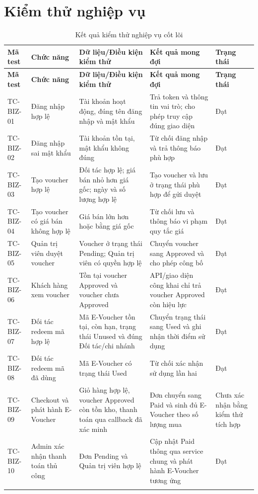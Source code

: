 \section{Kiểm thử nghiệp vụ}

\footnotesize
\begin{longtable}{|p{1.4cm}|p{2.6cm}|p{3.6cm}|p{3.7cm}|p{1.5cm}|}
\hline
\textbf{Mã test} & \textbf{Chức năng} & \textbf{Dữ liệu/Điều kiện kiểm thử} & \textbf{Kết quả mong đợi} & \textbf{Trạng thái} \\ \hline
\endfirsthead
\hline
\textbf{Mã test} & \textbf{Chức năng} & \textbf{Dữ liệu/Điều kiện kiểm thử} & \textbf{Kết quả mong đợi} & \textbf{Trạng thái} \\ \hline
\endhead
TC-BIZ-01 & Đăng nhập hợp lệ & Tài khoản hoạt động, đúng tên đăng nhập và mật khẩu & Trả token và thông tin vai trò; cho phép truy cập đúng giao diện & Đạt \\ \hline
TC-BIZ-02 & Đăng nhập sai mật khẩu & Tài khoản tồn tại, mật khẩu không đúng & Từ chối đăng nhập và trả thông báo phù hợp & Đạt \\ \hline
TC-BIZ-03 & Tạo voucher hợp lệ & Đối tác hợp lệ; giá bán nhỏ hơn giá gốc; ngày và số lượng hợp lệ & Tạo voucher và lưu ở trạng thái phù hợp để gửi duyệt & Đạt \\ \hline
TC-BIZ-04 & Tạo voucher có giá bán không hợp lệ & Giá bán lớn hơn hoặc bằng giá gốc & Từ chối lưu và thông báo vi phạm quy tắc giá & Đạt \\ \hline
TC-BIZ-05 & Quản trị viên duyệt voucher & Voucher ở trạng thái Pending; Quản trị viên có quyền hợp lệ & Chuyển voucher sang Approved và cho phép công bố & Đạt \\ \hline
TC-BIZ-06 & Khách hàng xem voucher & Tồn tại voucher Approved và voucher chưa Approved & API/giao diện công khai chỉ trả voucher Approved còn hiệu lực & Đạt \\ \hline
TC-BIZ-07 & Đối tác redeem mã hợp lệ & Mã E-Voucher tồn tại, còn hạn, trạng thái Unused và đúng Đối tác/chi nhánh & Chuyển trạng thái sang Used và ghi nhận thời điểm sử dụng & Đạt \\ \hline
TC-BIZ-08 & Đối tác redeem mã đã dùng & Mã E-Voucher có trạng thái Used & Từ chối xác nhận sử dụng lần hai & Đạt \\ \hline
TC-BIZ-09 & Checkout và phát hành E-Voucher & Giỏ hàng hợp lệ, voucher Approved còn tồn kho, thanh toán qua callback đã xác minh & Đơn chuyển sang Paid và sinh đủ E-Voucher theo số lượng mua & Chưa xác nhận bằng kiểm thử tích hợp \\ \hline
TC-BIZ-10 & Admin xác nhận thanh toán thủ công & Đơn Pending và Quản trị viên hợp lệ & Cập nhật Paid thông qua service chung và phát hành E-Voucher tương ứng & Đạt \\ \hline
\caption[]{Kết quả kiểm thử nghiệp vụ cốt lõi}\\
\end{longtable}
\normalsize

